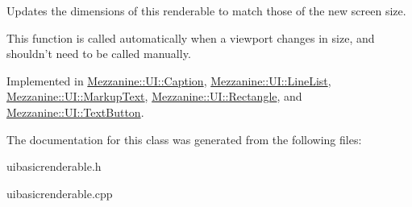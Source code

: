 Updates the dimensions of this renderable to match those of the new screen size. 

This function is called automatically when a viewport changes in size, and shouldn't need to be called manually. 

Implemented in \hyperlink{classMezzanine_1_1UI_1_1Caption_ab6c528d41fb194d19b2ec426a9d95db7}{Mezzanine::UI::Caption}, \hyperlink{classMezzanine_1_1UI_1_1LineList_a25e792075ec0c5165d5870d8e0710b7f}{Mezzanine::UI::LineList}, \hyperlink{classMezzanine_1_1UI_1_1MarkupText_a3a7e102a8b5b3217526ce183465ed69e}{Mezzanine::UI::MarkupText}, \hyperlink{classMezzanine_1_1UI_1_1Rectangle_a86d759d43ec0c1d429c572a782405e8c}{Mezzanine::UI::Rectangle}, and \hyperlink{classMezzanine_1_1UI_1_1TextButton_a06a5a6400dff268de5c91737de09fda9}{Mezzanine::UI::TextButton}.



The documentation for this class was generated from the following files:\begin{DoxyCompactItemize}
\item 
uibasicrenderable.h\item 
uibasicrenderable.cpp\end{DoxyCompactItemize}

